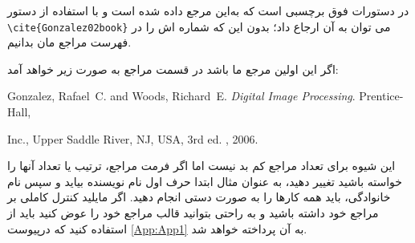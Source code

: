 در دستورات فوق   برچسبی است که به‌این مرجع داده شده است و با استفاده از دستور 
\verb!\cite{Gonzalez02book}!
می توان به آن ارجاع داد؛ بدون این که شماره اش را در فهرست مراجع مان بدانیم.

اگر این اولین مرجع ما باشد در قسمت مراجع به صورت زیر خواهد آمد:\\
\begin{latin}

\noindent [1] Gonzalez, Rafael~C. and Woods, Richard~E.  {\em Digital Image Processing}.  Prentice-Hall, 

Inc., Upper Saddle River, NJ, USA, 3rd ed. , 2006.
\end{latin}


این شیوه برای تعداد مراجع کم بد نیست اما اگر فرمت مراجع، ترتیب یا تعداد آنها را خواسته باشید تغییر دهید، به عنوان مثال ابتدا حرف اول نام نویسنده بیاید و سپس نام خانوادگی، باید همه کارها را به صورت دستی انجام دهید.
اگر مایلید کنترل کاملی بر مراجع خود داشته باشید و به راحتی بتوانید قالب مراجع خود را عوض کنید باید از  استفاده کنید که درپیوست  \ref{App:App1} به  آن پرداخته خواهد شد.
